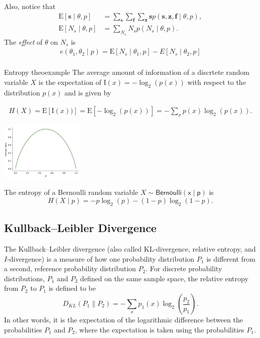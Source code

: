 \documentclass{tufte-handout}
\begin{document}
Also, notice that
\begin{align*}
\mathrm E[\mathbf s\mid \theta, p] &=  \sum_{\mathbf s} \sum_{\mathbf f} \sum_{\mathbf z} \mathbf s p(\mathbf s, \mathbf z, \mathbf f \mid \theta, p),\\ 
\mathrm E[N_s\mid \theta, p] &=   \sum_{N_s}  N_s p(N_s\mid \theta, p).
\end{align*}
The  \textit{effect} of $\theta$ on $N_s$ is
\begin{align*}
e(\theta_1,\theta_2\mid p) = \mathrm E[N_s\mid \theta_1, p] - E[N_s\mid \theta_2, p]\\
\end{align*}

\begin{mydef}{ Entropy }{theoexample}  
The average amount of information of a discrtete random variable $X$ is the expectation of $\mathrm I(x) = -\log_2(p(x))$ with respect to the distribution $p(x)$ and is given by

\begin{align*}
H(X) = \mathrm E[\mathrm I(x))]  =  \mathrm E[-\log_2(p(x))] = -\sum_x p(x)\log_2(p(x)).
\end{align*}
\end{mydef}

\begin{marginfigure}
\centering
\includegraphics[width=4cm]{fig/Entropy.png}
\caption{Entropy of the random variable $X\sim \mathsf{Bernoulli(x\mid p)}$ .
}
\end{marginfigure}

The entropy of a Bernoulli  random variable  $X\sim \mathsf{Bernoulli(x\mid p)}$ is $$H(X\mid p) = -{p}\log_2({p})-(1-{p})\log_2(1-{p}).$$

\subsection{Kullback–Leibler Divergence}

The Kullback–Leibler divergence (also called KL-divergence,  relative entropy, and $I$-divergence) is a  measure of how one probability distribution $P_1$ is different from a second, reference probability distribution $P_2$. For discrete probability distributions, $P_1$ and $P_2$ defined on the same sample space, the relative entropy from $P_2$ to $P_1$ is defined to be
$$D_{KL}(P_1\| P_2) = -\sum_x p_1(x) \log_2(\frac{p_2}{p_1}).$$
In other words, it is the expectation of the logarithmic difference between the probabilities $P_1$ and $P_2$, where the expectation is taken using the probabilities $P_1$.
\end{document}
